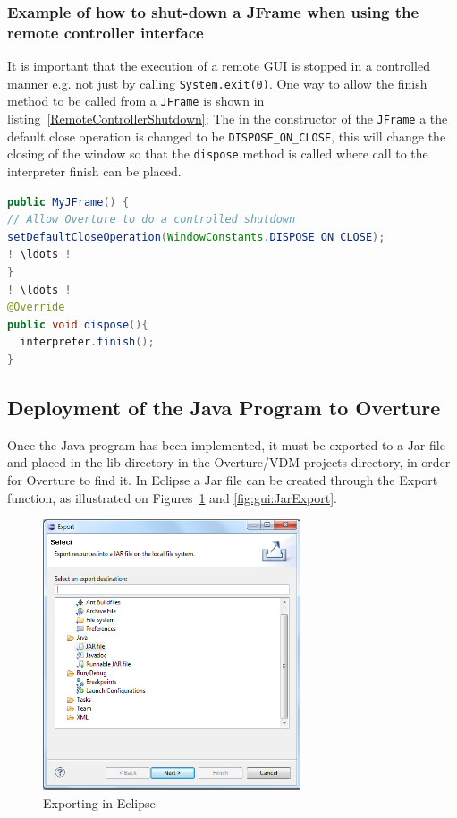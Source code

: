 \documentclass{overturerepchap}
\begin{document}
\subsubsection{Example of how to shut-down a JFrame when using the remote controller interface}
It is important that the execution of a remote GUI is stopped in a controlled manner e.g. not just by calling \texttt{System.exit(0)}. One way to allow the finish method to be called from a \texttt{JFrame} is shown in listing~\ref{RemoteControllerShutdown}; The in the constructor of the \texttt{JFrame} a the default close operation is changed to be \texttt{DISPOSE\_ON\_CLOSE}, this will change the closing of the window so that the \texttt{dispose} method is called where call to the interpreter finish can be placed.

\begin{lstlisting}[language=Java,label=RemoteControllerShutdown,caption=Java implementation of a \texttt{finish} method for a \texttt{JFrame}., captionpos=b]
public MyJFrame() {
// Allow Overture to do a controlled shutdown
setDefaultCloseOperation(WindowConstants.DISPOSE_ON_CLOSE);
! \ldots !
}
! \ldots !
@Override
public void dispose(){
  interpreter.finish();
}
\end{lstlisting}

\subsection{Deployment of the Java Program to Overture}
Once the Java program has been implemented, it must be exported to a Jar file and placed in the lib directory in the Overture/VDM projects directory, in order for Overture to find it.
In Eclipse a Jar file can be created through the Export function, as illustrated on Figures~\ref{fig:gui:EclipseExport} and \ref{fig:gui:JarExport}.

\begin{figure}[h]
\begin{center}
  \includegraphics[width=3in]{figures/SmokersExport}
  \caption[labelInTOC]{Exporting in Eclipse}
  \label{fig:gui:EclipseExport}
\end{center}
\end{figure}
\end{document}
